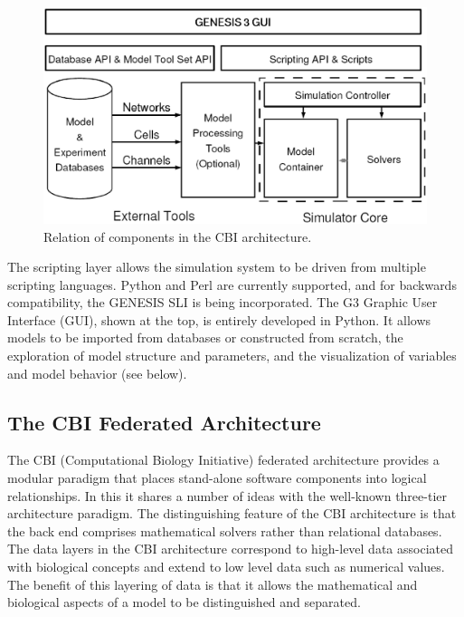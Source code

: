\documentclass[12pt]{article}
\begin{document}
\begin{figure}[ht]
  \centering
    \includegraphics[scale=0.4]{figures/G3arch.eps}
  \caption{Relation of components in the CBI architecture.}
  \label{fig:cbi-arch}
\end{figure}

The scripting layer allows the simulation system to be driven from
multiple scripting languages. Python and Perl are currently supported,
and for backwards compatibility, the GENESIS SLI is being
incorporated. The G3 Graphic User Interface (GUI), shown at the top,
is entirely developed in Python.  It allows models to be imported from
databases or constructed from scratch, the exploration of model
structure and parameters, and the visualization of variables and model
behavior (see below).


\subsection{The CBI Federated Architecture}
The CBI (Computational Biology Initiative) federated architecture
provides a modular paradigm that places stand-alone software
components into logical relationships. In this it shares a number of
ideas with the well-known three-tier architecture paradigm.  The
distinguishing feature of the CBI architecture is that the back end
comprises mathematical solvers rather than relational databases.  The
data layers in the CBI architecture correspond to high-level data
associated with biological concepts and extend to low level data such
as numerical values. The benefit of this layering of data is that it
allows the mathematical and biological aspects of a model to be
distinguished and separated.
\end{document}
